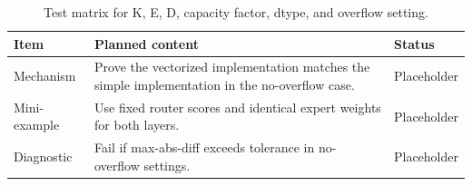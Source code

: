 \begin{table}[H]
\centering
\caption{Test matrix for K, E, D, capacity factor, dtype, and overflow setting.}
\label{tab:ch06-equivalence-tests-against-the-naive-layer}
\begin{tabularx}{\textwidth}{p{}X p{}}
\toprule
Item & Planned content & Status \\
\midrule
Mechanism & Prove the vectorized implementation matches the simple implementation in the no-overflow case. & Placeholder \\
Mini-example & Use fixed router scores and identical expert weights for both layers. & Placeholder \\
Diagnostic & Fail if max-abs-diff exceeds tolerance in no-overflow settings. & Placeholder \\
\bottomrule
\end{tabularx}
\end{table}
